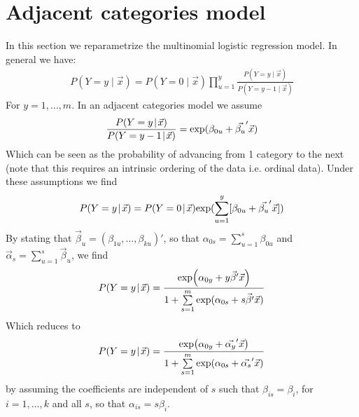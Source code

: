 \documentclass[12pt]{article}
\begin{document}
\section{Adjacent categories model}
In this section we reparametrize the multinomial logistic regression model. In general we have:
\begin{align*}
	P(Y=y\!\mid\!\vec{x}) = P(Y=0\!\mid\!\vec{x}) \prod_{u = 1}^{y} \frac{P(Y=y\!\mid\!\vec{x})}{P(Y=y-1\!\mid\!\vec{x})}
\end{align*}
For $y = 1,\ldots,m$. In an adjacent categories model we assume
\begin{align*}
	\frac{P(Y=y\!\mid\!\vec{x})}{P(Y=y-1\!\mid\!\vec{x})} = \textup{exp}(\beta_{0u} + \vec{\beta_{u}}'\vec{x})
\end{align*}
Which can be seen as the probability of advancing from 1 category to the next (note that this requires an intrinsic ordering of the data i.e. ordinal data). Under these assumptions we find
\begin{align*}
	P(Y=y\!\mid\!\vec{x}) = P(Y=0\!\mid\!\vec{x}) \textup{exp}(\sum_{u = 1}^{y}[\beta_{0u} + \vec{\beta_{u}}'\vec{x}])
\end{align*}
By stating that $\vec{\beta}_{u}=(\beta_{1u},\ldots,\beta_{ku})'$, so that $\alpha_{0s}=\sum_{u=1}^{s}\beta_{0u}$ and $\vec{\alpha}_{s}=\sum_{u=1}^{s}\vec{\beta}_{u}$, we find
\begin{align*}
	P(Y=y\!\mid\!\vec{x})=\frac{\textup{exp}\!\left(\alpha_{0y}+y\vec{\beta}'\vec{x}\right)}{1+\sum\limits_{s=1}^{m}\textup{exp}(\alpha_{0s}+s\vec{\beta}'\vec{x})}
\end{align*}
Which reduces to
\begin{align*}
	P(Y=y\!\mid\!\vec{x})=\frac{\textup{exp}\!\left(\alpha_{0y}+\vec{\alpha_y}'\vec{x}\right)}{1+\sum\limits_{s=1}^{m}\textup{exp}(\alpha_{0s}+\vec{\alpha_s}'\vec{x})}
\end{align*}
by assuming the coefficients are independent of $s$ such that $\beta_{is}=\beta_{i}$, for $i=1,\ldots,k$ and all $s$, so that $\alpha_{is}=s\beta_{i}$.
\end{document}
